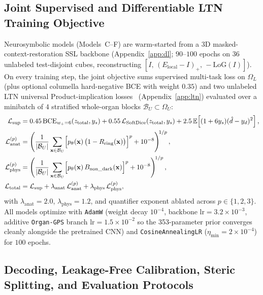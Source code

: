 \documentclass[10pt,a4paper]{article}
\renewcommand{\_}{\origunderscore\allowbreak}
\begin{document}
\subsection{Joint Supervised and Differentiable LTN Training Objective}

Neurosymbolic models (Models~C--F) are warm-started from a 3D masked-context-restoration SSL backbone (Appendix~\ref{app:dl}; $90\text{--}100$ epochs on $36$ unlabeled test-disjoint cubes, reconstructing $[I,\, (E_{\text{local}} - I)_+,\, -\text{LoG}(I)]$). On every training step, the joint objective sums supervised multi-task loss on $\Omega_L$ (plus optional columella hard-negative BCE with weight $0.35$) and two unlabeled LTN universal Product-implication losses~\cite{badreddine2022ltn} (Appendix~\ref{app:ltn}) evaluated over a minibatch of $4$ stratified whole-organ blocks $\mathcal{B}_U \subset \Omega_U$:
\begin{align}
    \mathcal{L}_{\text{sup}} &= 0.45\,\text{BCE}_{w_+=6}(z_{\text{total}}, y_s) + 0.55\,\mathcal{L}_{\text{SoftDice}}(z_{\text{total}}, y_s) + 2.5\,\mathbb{E}\!\left[(1 + 6 y_s)(\hat{d} - y_d)^2\right], \label{eq:loss_sup} \\
    \mathcal{L}_{\text{anat}}^{(p)} &= \left(\frac{1}{|\mathcal{B}_U|} \sum_{\mathbf{x}\in\mathcal{B}_U} \Bigl[p_\theta(\mathbf{x})\,\bigl(1 - R_{\text{ring}}(\mathbf{x})\bigr)\Bigr]^p + 10^{-8}\right)^{\!1/p}, \label{eq:loss_anat} \\
    \mathcal{L}_{\text{phys}}^{(p)} &= \left(\frac{1}{|\mathcal{B}_U|} \sum_{\mathbf{x}\in\mathcal{B}_U} \Bigl[p_\theta(\mathbf{x})\,B_{\text{non\_dark}}(\mathbf{x})\Bigr]^p + 10^{-8}\right)^{\!1/p}, \label{eq:loss_phys} \\
    \mathcal{L}_{\text{total}} &= \mathcal{L}_{\text{sup}} + \lambda_{\text{anat}}\,\mathcal{L}_{\text{anat}}^{(p)} + \lambda_{\text{phys}}\,\mathcal{L}_{\text{phys}}^{(p)},
    \label{eq:loss_total}
\end{align}
with $\lambda_{\text{anat}} = 2.0$, $\lambda_{\text{phys}} = 1.2$, and quantifier exponent ablated across $p \in \{1, 2, 3\}$. All models optimize with \texttt{AdamW} (weight decay $10^{-4}$, backbone $\text{lr} = 3.2\times 10^{-3}$, additive \texttt{Organ-GPS} branch $\text{lr} = 1.5\times 10^{-2}$ so the 353-parameter prior converges cleanly alongside the pretrained CNN) and \texttt{CosineAnnealingLR} ($\eta_{\min} = 2\times 10^{-4}$) for $100$ epochs.

\subsection{Decoding, Leakage-Free Calibration, Steric Splitting, and Evaluation Protocols}
\end{document}
